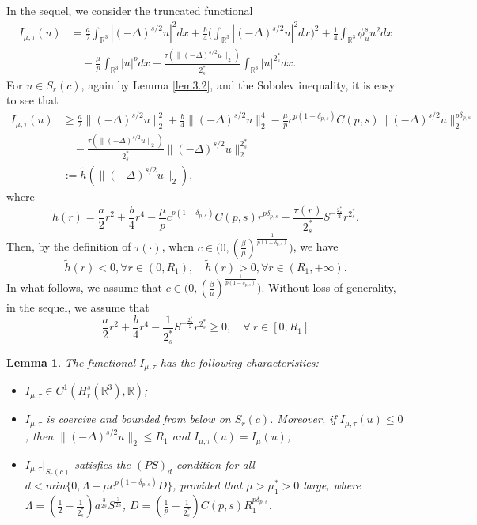 \documentclass[11pt]{article}
\numberwithin{equation}{section}
\newtheorem{lemma}[theorem]{Lemma}
\begin{document}
In the sequel, we consider the truncated functional
\begin{equation}
\begin{split}
I_{\mu,\tau}(u)
&= \frac{a}{2}\int_{\mathbb{R}^3}|(-\Delta)^{s/2}u|^2dx+\frac{b}{4}
 \Big(\int_{\mathbb{R}^3}|(-\Delta)^{s/2}u|^2dx\Big)^2
 +\frac{1}{4}\int_{\mathbb{R}^3}\phi^s_u u^2dx\\
&\quad -\frac{\mu}{p}\int_{\mathbb{R}^3}|u|^pdx
 -\frac{\tau(\|(-\Delta)^{s/2}u\|_2)}{2^*_s}\int_{\mathbb{R}^3}|u|^{2^*_s}dx.
\end{split}
\end{equation}
For $u\in S_{r}(c)$, again by Lemma \ref{lem3.2}, and the Sobolev inequality,
it is easy to see that
\begin{align*}
I_{\mu,\tau}(u)
&\geq  \frac{a}{2}\|(-\Delta)^{s/2}u\|^2_2+\frac{b}{4}\|(-\Delta)^{s/2}u\|^4_2
 -\frac{\mu}{p}c^{p(1-\delta_{p,s})}C({p,s})\|(-\Delta)^{s/2}u\|^{p\delta_{p,s}}_2\\
&\quad -\frac{\tau(\|(-\Delta)^{s/2}u\|_2)}{2^*_s}\|(-\Delta)^{s/2}u\|^{2^*_s}_2\\
&:= \tilde{h}(\|(-\Delta)^{s/2}u\|_2),
\end{align*}
where
$$
\tilde{h}(r)=\frac{a}{2}r^2+\frac{b}{4}r^4
-\frac{\mu}{p}c^{p(1-\delta_{p,s})}C({p,s})r^{p\delta_{p,s}}
-\frac{\tau(r)}{2^*_s}S^{-\frac{2^*_s}{2}}r^{2^*_s}.
$$
Then, by the definition of $\tau(\cdot)$, when
$c\in \big(0, (\frac{\beta}{\mu})^{\frac{1}{p(1-\delta_{p, s})}}\big)$, we have
$$
\tilde{h}(r)<0, \forall r\in(0, R_1),\quad
\tilde{h}(r)>0, \forall r\in(R_1, +\infty).
$$
In what follows, we  assume that
$c\in \big(0, (\frac{\beta}{\mu})^{\frac{1}{p(1-\delta_{p, s})}}\big)$.
Without loss of generality, in the sequel, we  assume that
\begin{equation}\label{1.9}
\frac{a}{2}r^2+\frac{b}{4}r^4-\frac{1}{2^*_s}S^{-\frac{2^*_s}{2}}r^{2^*_s}\geq 0,
\quad \forall ~r\in [0, R_1]
\end{equation}

\begin{lemma}\label{lem2.161}
The functional $I_{\mu,\tau}$ has the following characteristics:
\begin{itemize}
\item[(i)] $I_{\mu,\tau} \in C^1(H^s_{r}(\mathbb{R}^3), \mathbb{R})$;

\item[(ii)] $I_{\mu,\tau}$ is coercive and bounded from below on $S_{r}(c)$.
Moreover, if $I_{\mu,\tau}(u)\leq 0$, then $\|(-\Delta)^{s/2}u\|_2\leq R_1$ and
$I_{\mu,\tau}(u)=I_{\mu}(u)$;

\item[(iii)] $ I_{\mu,\tau}|_{S_{r}(c)}$ satisfies the $(PS)_d$ condition for all
$d<min\{0, \Lambda-\mu c^{p(1-\delta_{p,s})}D\}$, provided that $\mu>\mu^*_1>0$
large, where $\Lambda=(\frac{1}{2}-\frac{1}{2^*_s}) a^{\frac{3}{2s}}S^{\frac{3}{2s}}$,
$D=(\frac{1}{p}-\frac{1}{2^*_s})C(p,s)R_1^{p\delta_{p,s}}$.
\end{itemize}
\end{lemma}
\end{document}
